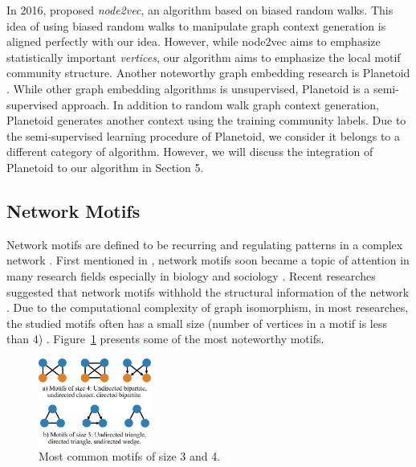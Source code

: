 \documentclass[letterpaper]{article}
\begin{document}
            In 2016, \citeauthor{node2vec} proposed \emph{node2vec}, an algorithm based on biased random
            walks. This idea of using biased random walks to manipulate graph context generation
            is aligned perfectly with our idea. However, while node2vec aims to emphasize statistically
            important \emph{vertices}, our algorithm aims to emphasize the local motif community
            structure. Another noteworthy graph embedding research is Planetoid \cite{planetoid}. 
            While other graph embedding algorithms is unsupervised, 
            Planetoid is a semi-supervised approach. In addition to random walk graph context generation, 
            Planetoid generates another context using the training community labels. Due to the
            semi-supervised learning procedure of Planetoid, we consider it belongs to a different
            category of algorithm. However, we will discuss the integration of Planetoid to our
            algorithm in Section 5.

        \subsection{Network Motifs}

            Network motifs are defined to be recurring and regulating patterns in a complex network 
            \cite{netmotif}. First mentioned in \cite{motifblockmilo}, network motifs
            soon became a topic of attention in many research fields especially in biology and sociology
            \cite{masoudirev}. Recent researches suggested that network motifs withhold the structural 
            information of the network \cite{juremotif,deepgraphkernel}. Due to the
            computational complexity of graph isomorphism, in most researches, the studied motifs 
            often has a small size (number of vertices in a motif is less than 4) \cite{motifdecrev}.
            Figure~\ref{fig:motifs} presents some of the most noteworthy motifs.

            \begin{figure}
                \centering
                \includegraphics[width=0.33\textwidth]{fig7_motifs}
                \caption{Most common motifs of size 3 and 4.}
                \label{fig:motifs}
            \end{figure}
\end{document}
